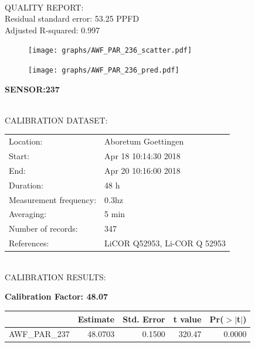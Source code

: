 \documentclass[oneside]{report}
\begin{document}
\hrulefill\\
QUALITY REPORT:\\
Residual standard error: 53.25 PPFD\\
Adjusted R-squared: 0.997



\begin{figure}[H]
  \centering
  \texttt{[image: graphs/AWF\_PAR\_236\_scatter.pdf]}
\end{figure}




\begin{figure}[H]
  \centering
  \texttt{[image: graphs/AWF\_PAR\_236\_pred.pdf]}
\end{figure}

\pagebreak


\begin{center}
\large{\textbf{SENSOR:237}}\\
\end{center}

\hrulefill\\
CALIBRATION DATASET:\\
\begin{table}[h!]
  \centering
  \label{tab:table1}
  \begin{tabular}{ll}
    Location: & Aboretum Goettingen\\ 
    
    
    Start:  & Apr 18 10:14:30 2018 \\
    End:   & Apr 20 10:16:00 2018\\ 
    Duration: & 48 h\\
    Measurement frequency: & 0.3hz\\
    Averaging:  &5 min\\
    Number of records: & 347 \\
    References: & LiCOR Q52953, Li-COR Q 52953 \\
  \end{tabular}
\end{table}

\hrulefill\\
CALIBRATION RESULTS:\\


\begin{center}
\textbf{\large{Calibration Factor: 48.07}}\\
\end{center}
\begin{table}[ht]
\centering
\begin{tabular}{rrrrr}
  \hline
 & Estimate & Std. Error & t value & Pr($>$$|$t$|$) \\ 
  \hline
AWF\_PAR\_237 & 48.0703 & 0.1500 & 320.47 & 0.0000 \\ 
   \hline
\end{tabular}
\end{table}
\end{document}
